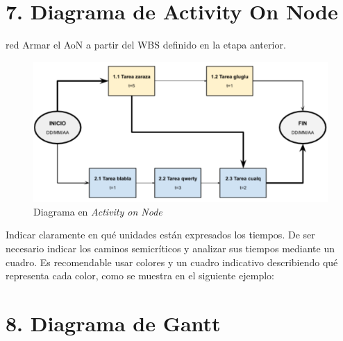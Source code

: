 \documentclass[11pt]{charter}
\begin{document}
\section{7. Diagrama de Activity On Node}
\label{sec:AoN}

\begin{consigna}{red}
Armar el AoN a partir del WBS definido en la etapa anterior. 



\end{consigna}

\begin{figure}[htpb]
\centering 
\includegraphics[width=.8\textwidth]{./Figuras/AoN.png}
\caption{Diagrama en \textit{Activity on Node}}
\label{fig:AoN}
\end{figure}

Indicar claramente en qué unidades están expresados los tiempos.
De ser necesario indicar los caminos semicríticos y analizar sus tiempos mediante un cuadro.
Es recomendable usar colores y un cuadro indicativo describiendo qué representa cada color, como se muestra en el siguiente ejemplo:



\section{8. Diagrama de Gantt}
\label{sec:gantt}
\end{document}
